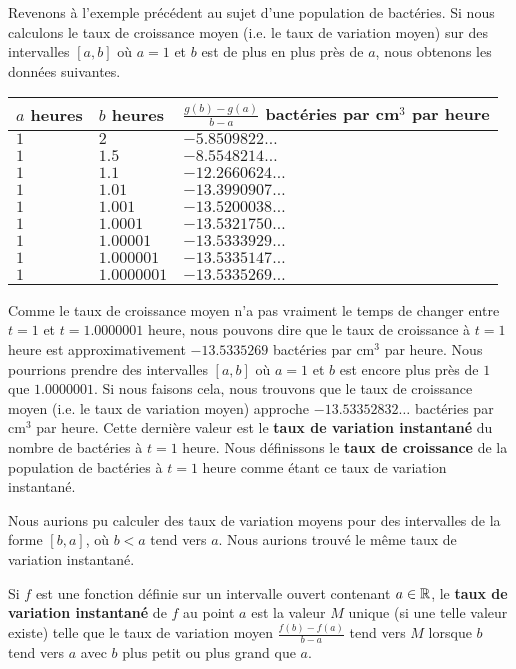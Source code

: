 {\begin{egg}
Revenons à l'exemple précédent au sujet d'une population de bactéries.
Si nous calculons le taux de croissance moyen (i.e. le taux de variation
moyen) sur des intervalles $[a,b]$ où $a=1$ et $b$ est de plus en plus
près de $a$, nous obtenons les données suivantes.
\begin{center}
\begin{tabular}{l|l|l}
\hline
$a$ heures & $b$ heures & \rule{0em}{1.3em}
$\frac{g(b)-g(a)}{b-a}$ bactéries par cm$^3$ par heure \\[1ex]
\hline
$1$ & $2$ & $-5.8509822\ldots $ \\
$1$ & $1.5$ & $-8.5548214\ldots$ \\
$1$ & $1.1$ & $-12.2660624\ldots$ \\
$1$ & $1.01$ & $-13.3990907\ldots$ \\
$1$ & $1.001$ & $-13.5200038\ldots$ \\
$1$ & $1.0001$ & $-13.5321750\ldots$ \\
$1$ & $1.00001$ & $-13.5333929\ldots$ \\
$1$ & $1.000001$ & $-13.5335147\ldots$ \\
$1$ & $1.0000001$ & $-13.5335269\ldots$ \\
\hline
\end{tabular}
\end{center}
Comme le taux de croissance moyen n'a pas vraiment le temps de changer
entre $t=1$ et $t=1.0000001$ heure, nous pouvons dire que le taux de
croissance à $t=1$ heure est approximativement $-13.5335269$
bactéries par cm$^3$ par heure.  Nous pourrions prendre des intervalles
$[a,b]$ où $a=1$ et $b$ est encore plus près de $1$ que $1.0000001$.
Si nous faisons cela, nous trouvons que le taux de croissance moyen
(i.e. le taux de variation moyen) approche $-13.53352832\ldots$
bactéries par cm$^3$ par heure.  Cette dernière valeur est le
{\bfseries taux de variation instantané} du nombre de bactéries à
$t=1$ heure.  Nous définissons le {\bfseries taux de croissance} de la
population de bactéries à $t=1$ heure comme étant ce taux de variation
instantané.

Nous aurions pu calculer des taux de variation moyens pour des
intervalles de la forme $[b,a]$, où $b<a$ tend vers $a$.  Nous aurions
trouvé le même taux de variation instantané.
\label{bacter1}
\end{egg}

\begin{focus}{\dfn} 
Si $f$ est une fonction définie sur un intervalle ouvert contenant
$a \in \mathbb{R}$, le {\bfseries taux de variation instantané} de $f$ au
point $a$ est la valeur $M$ unique (si une telle valeur existe) telle
que le taux de variation moyen $\displaystyle \frac{f(b)-f(a)}{b-a}$
tend vers $M$ lorsque $b$ tend vers $a$ avec $b$ plus petit ou
plus grand que $a$.
\end{focus}

}
